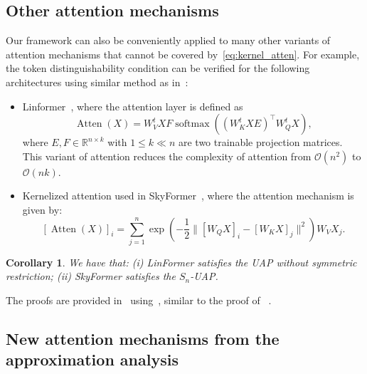 \documentclass{article}
\newtheorem{corollary}{Corollary}
\newcommand{\cjp}[1]{{\footnotesize\textcolor{orange}{JC: #1}}}
\newcommand{\ql}[1]{{\footnotesize\textcolor{red}{QL: #1}}}
\begin{document}
\subsection{Other attention mechanisms}
Our framework can also be conveniently applied to many other variants of attention mechanisms that cannot be covered by~\eqref{eq:kernel_atten}. For example, the token distinguishability condition can be verified for the following architectures using similar method as in~:
\begin{itemize}
    \item Linformer~\cite{wang2020linformer}, where the attention layer is defined as
    \begin{equation}
        \label{eq:linformer}
        \operatorname{Atten}(X)=W_V^{t} X {F}\operatorname{softmax}((W_K^{t} X{E})^\top W_Q^{t} X),
\end{equation}
where $E, F\in \mathbb R^{n\times k}$ with $1\le k\ll n$ are two trainable projection matrices. This variant of attention reduces the complexity of attention from $\mathcal O(n^2)$ to $\mathcal O(nk)$.
    \item Kernelized attention used in SkyFormer~\cite{chen2021skyformer}, where the attention mechanism is given by:
    \begin{equation}
        \label{eq:skyformer}
        [\operatorname{Atten}(X)]_i= \sum_{j=1}^n \exp{\left(-\frac{1}{2}\|[W_QX]_i-[W_KX]_j\|^2\right)}W_VX_j.
    \end{equation} 
\end{itemize}
\begin{corollary}
    We have that: (i)
LinFormer satisfies the UAP without symmetric restriction; (ii) SkyFormer satisfies the $S_n$-UAP.
\end{corollary}
The proofs are provided in~ using~, similar to the proof of ~.

\subsection{New attention mechanisms from the approximation analysis}
\label{sec:new_atten}

\end{document}
